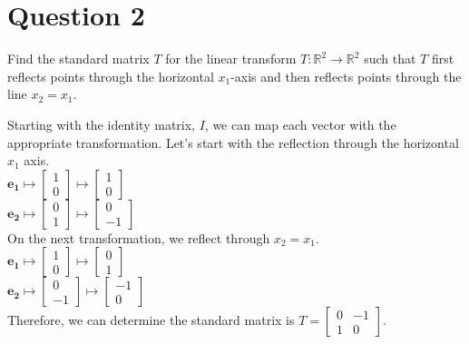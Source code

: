 \documentclass{report}
\begin{document}
\section*{Question 2}
\begin{example}
    Find the standard matrix $T$ for the linear transform $T : \mathbb{R}^2 \rightarrow \mathbb{R}^2$ such that $T$ first reflects points through the horizontal $x_1$-axis and then reflects points through the line $x_2 = x_1$.
\end{example}
\begin{center}
Starting with the identity matrix, $I$, we can map each vector with the appropriate transformation. Let's start with the reflection through the horizontal $x_1$ axis.\\\vspace{3mm}
$\mathbf{e_1}\mapsto \begin{bmatrix} 1 \\ 0 \end{bmatrix} \mapsto \begin{bmatrix} 1 \\ 0 \end{bmatrix}$\\
$\mathbf{e_2}\mapsto \begin{bmatrix} 0 \\ 1 \end{bmatrix} \mapsto \begin{bmatrix} 0 \\ -1 \end{bmatrix}$\\\vspace{3mm}
On the next transformation, we reflect through $x_2=x_1$.\\\vspace{3mm}
$\mathbf{e_1}\mapsto \begin{bmatrix} 1 \\ 0 \end{bmatrix} \mapsto \begin{bmatrix} 0 \\ 1 \end{bmatrix}$\\
$\mathbf{e_2}\mapsto \begin{bmatrix} 0 \\ -1 \end{bmatrix} \mapsto \begin{bmatrix} -1 \\ 0 \end{bmatrix}$\\\vspace{3mm}
Therefore, we can determine the standard matrix is $T=\begin{bmatrix} 
    0 & -1 \\ 
    1 & 0 
\end{bmatrix}$.
\end{center}
\clearpage
\end{document}
